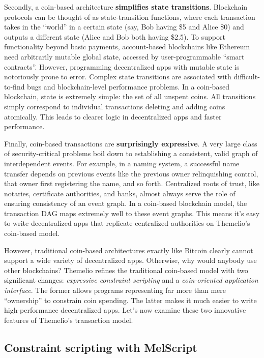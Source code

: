 \documentclass[headinclude,12pt]{scrbook}
\begin{document}
Secondly, a coin-based architecture \textbf{simplifies state transitions}. Blockchain protocols can be thought of as state-transition functions, where each transaction takes in the ``world'' in a certain state (say, Bob having \$5 and Alice \$0) and outputs a different state (Alice and Bob both having \$2.5). To support functionality beyond basic payments, account-based blockchains like Ethereum need arbitrarily mutable global state, accessed by user-programmable ``smart contracts''. However, programming decentralized apps with mutable state is notoriously prone to error. Complex state transitions are associated with difficult-to-find bugs and blockchain-level performance problems. In a coin-based blockchain, state is extremely simple: the set of all unspent coins. All transitions simply correspond to individual transactions deleting and adding coins atomically. This leads to clearer logic in decentralized apps and faster performance.

Finally, coin-based transactions are \textbf{surprisingly expressive}. A very large class of security-critical problems boil down to establishing a consistent, valid graph of interdependent events. For example, in a naming system, a successful name transfer depends on previous events like the previous owner relinquishing control, that owner first registering the name, and so forth. Centralized roots of trust, like notaries, certificate authorities, and banks, almost always serve the role of ensuring consistency of an event graph. In a coin-based blockchain model, the transaction DAG maps extremely well to these event graphs. This means it's easy to write decentralized apps that replicate centralized authorities on Themelio's coin-based model.

However, traditional coin-based architectures exactly like Bitcoin clearly cannot support a wide variety of decentralized apps. Otherwise, why would anybody use other blockchains? Themelio refines the traditional coin-based model with two significant changes: \emph{expressive constraint scripting} and a \textit{coin-oriented application interface}. The former allows programs representing far more than mere ``ownership'' to constrain coin spending. The latter makes it much easier to write high-performance decentralized apps. Let's now examine these two innovative features of Themelio's transaction model.

\subsection{Constraint scripting with MelScript} \label{ss:melscript}
\end{document}
